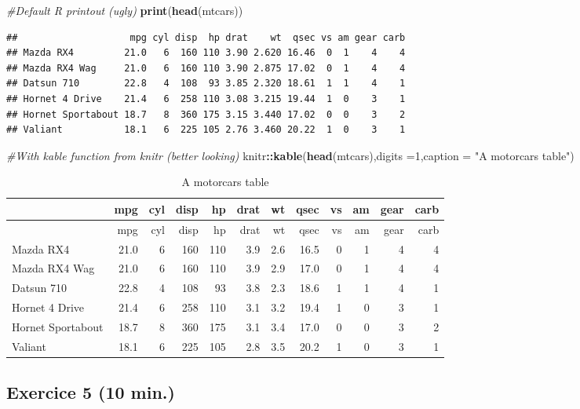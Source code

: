 \documentclass[]{article}
\newenvironment{Shaded}{\begin{snugshade}}{\end{snugshade}}
\newcommand{\CommentTok}[1]{\textcolor[rgb]{0.56,0.35,0.01}{\textit{#1}}}
\newcommand{\DataTypeTok}[1]{\textcolor[rgb]{0.13,0.29,0.53}{#1}}
\newcommand{\DecValTok}[1]{\textcolor[rgb]{0.00,0.00,0.81}{#1}}
\newcommand{\KeywordTok}[1]{\textcolor[rgb]{0.13,0.29,0.53}{\textbf{#1}}}
\newcommand{\NormalTok}[1]{#1}
\newcommand{\OperatorTok}[1]{\textcolor[rgb]{0.81,0.36,0.00}{\textbf{#1}}}
\newcommand{\StringTok}[1]{\textcolor[rgb]{0.31,0.60,0.02}{#1}}
\begin{document}
\begin{Shaded}
\begin{Highlighting}[]
\CommentTok{#Default R printout (ugly)}
\KeywordTok{print}\NormalTok{(}\KeywordTok{head}\NormalTok{(mtcars))}
\end{Highlighting}
\end{Shaded}

\begin{verbatim}
##                    mpg cyl disp  hp drat    wt  qsec vs am gear carb
## Mazda RX4         21.0   6  160 110 3.90 2.620 16.46  0  1    4    4
## Mazda RX4 Wag     21.0   6  160 110 3.90 2.875 17.02  0  1    4    4
## Datsun 710        22.8   4  108  93 3.85 2.320 18.61  1  1    4    1
## Hornet 4 Drive    21.4   6  258 110 3.08 3.215 19.44  1  0    3    1
## Hornet Sportabout 18.7   8  360 175 3.15 3.440 17.02  0  0    3    2
## Valiant           18.1   6  225 105 2.76 3.460 20.22  1  0    3    1
\end{verbatim}

\begin{Shaded}
\begin{Highlighting}[]
\CommentTok{#With kable function from knitr (better looking)}
\NormalTok{knitr}\OperatorTok{::}\KeywordTok{kable}\NormalTok{(}\KeywordTok{head}\NormalTok{(mtcars),}\DataTypeTok{digits =}\DecValTok{1}\NormalTok{,}\DataTypeTok{caption =} \StringTok{"A motorcars table"}\NormalTok{)}
\end{Highlighting}
\end{Shaded}

\begin{longtable}[]{@{}lrrrrrrrrrrr@{}}
\caption{A motorcars table}\tabularnewline
\toprule
& mpg & cyl & disp & hp & drat & wt & qsec & vs & am & gear &
carb\tabularnewline
\midrule
\endfirsthead
\toprule
& mpg & cyl & disp & hp & drat & wt & qsec & vs & am & gear &
carb\tabularnewline
\midrule
\endhead
Mazda RX4 & 21.0 & 6 & 160 & 110 & 3.9 & 2.6 & 16.5 & 0 & 1 & 4 &
4\tabularnewline
Mazda RX4 Wag & 21.0 & 6 & 160 & 110 & 3.9 & 2.9 & 17.0 & 0 & 1 & 4 &
4\tabularnewline
Datsun 710 & 22.8 & 4 & 108 & 93 & 3.8 & 2.3 & 18.6 & 1 & 1 & 4 &
1\tabularnewline
Hornet 4 Drive & 21.4 & 6 & 258 & 110 & 3.1 & 3.2 & 19.4 & 1 & 0 & 3 &
1\tabularnewline
Hornet Sportabout & 18.7 & 8 & 360 & 175 & 3.1 & 3.4 & 17.0 & 0 & 0 & 3
& 2\tabularnewline
Valiant & 18.1 & 6 & 225 & 105 & 2.8 & 3.5 & 20.2 & 1 & 0 & 3 &
1\tabularnewline
\bottomrule
\end{longtable}

\hypertarget{exercice-5-10-min.}{%
\subsection{Exercice 5 (10 min.)}\label{exercice-5-10-min.}}
\end{document}
